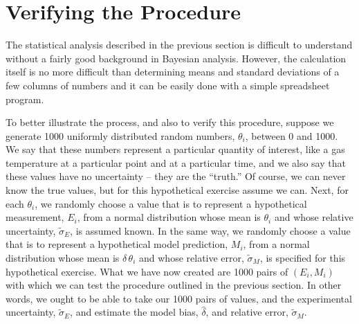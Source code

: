 \section{Verifying the Procedure}

The statistical analysis described in the previous section is difficult to understand without a fairly good background in Bayesian analysis. However,
the calculation itself is no more difficult than determining means and standard deviations of a few columns of numbers and it can be easily done with
a simple spreadsheet program.

To better illustrate the process, and also to verify this procedure, suppose we generate 1000 uniformly distributed
random numbers, $\theta_i$, between 0 and 1000. We say that these numbers represent a particular quantity of interest, like a gas temperature at a particular
point and at a particular time, and we also say that these values
have no uncertainty -- they are the ``truth.'' Of course, we can never know the true values, but for this hypothetical exercise assume we can. Next, for each
$\theta_i$, we randomly choose a value that is to represent a hypothetical measurement, $E_i$, from a normal distribution whose mean is $\theta_i$
and whose relative uncertainty, $\widetilde{\sigma}_E$, is assumed known. In the same way, we randomly choose a value that is to represent a hypothetical
model prediction, $M_i$, from a normal distribution whose mean is $\delta \, \theta_i$ and whose relative error, $\widetilde{\sigma}_M$, is
specified for this hypothetical exercise.
What we have now created are 1000 pairs of $(E_i,M_i)$ with which we can test the procedure outlined in the previous section. In other words, we ought to be
able to take our 1000 pairs of values, and the experimental uncertainty, $\widetilde{\sigma}_E$, and estimate the model bias, $\hat{\delta}$, and relative error,
$\widetilde{\sigma}_M$.

